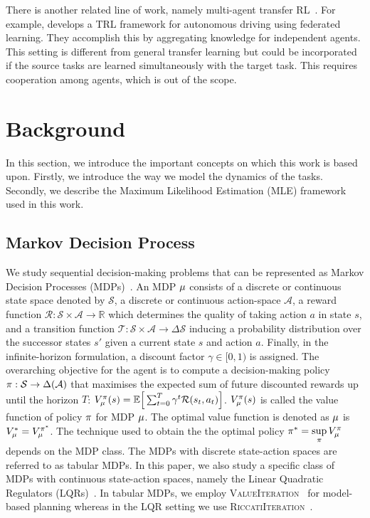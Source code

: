 There is another related line of work, namely multi-agent transfer RL~\citep{da2019survey}. For example, \citep{liang2023federated} develops a TRL framework for autonomous driving using federated learning. They accomplish this by aggregating knowledge for independent agents. This setting is different from general transfer learning but could be incorporated if the source tasks are learned simultaneously with the target task. This requires cooperation among agents, which is out of the scope.%

\section{Background}\label{sec:background}

In this section, we introduce the important concepts on which this work is based upon. Firstly, we introduce the way we model the dynamics of the tasks. Secondly, we describe the Maximum Likelihood Estimation (MLE) framework used in this work.

\subsection{Markov Decision Process}\label{sec:mdp}
We study sequential decision-making problems that can be represented as Markov Decision Processes (MDPs)~\citep{puterman2014markov}. An MDP $\mu$ consists of a discrete or continuous state space denoted by $\mathcal{S}$, a discrete or continuous action-space $\mathcal{A}$, a reward function $\mathcal{R} : \mathcal{S} \times \mathcal{A} \rightarrow \mathbb{R}$ which determines the quality of taking action $a$ in state $s$, and a transition function $\mathcal{T} : \mathcal{S} \times \mathcal{A} \rightarrow \Delta\mathcal{S}$ inducing a probability distribution over the successor states $s'$ given a current state $s$ and action $a$. Finally, in the infinite-horizon formulation, a discount factor $\gamma \in [0, 1)$ is assigned. The overarching objective for the agent is to compute a decision-making policy $\pi : \mathcal{S} \rightarrow \Delta(\mathcal{A})$ that maximises the expected sum of future discounted rewards up until the horizon $T$: $V_\mu^{\pi}(s) = \mathbb{E}\Big[\sum_{t=0}^T \gamma^t \mathcal{R}(s_t, a_t)\Big]$. $V_\mu^{\pi}(s)$ is called the value function of policy $\pi$ for MDP $\mu$. The optimal value function is denoted as $\mu$ is $V_\mu^{*} = V_\mu^{\pi^{*}}$. The technique used to obtain the the optimal policy $\pi^{*} = \underset{\pi}{\sup} \, V_\mu^{\pi}$ depends on the MDP class. The MDPs with discrete state-action spaces are referred to as tabular MDPs. In this paper, we also study a specific class of MDPs with continuous state-action spaces, namely the Linear Quadratic Regulators (LQRs)~\citep{kalman1960new}. In tabular MDPs, we employ \textsc{ValueIteration}~\citep{puterman2014markov} for model-based planning whereas in the LQR setting we use \textsc{RiccatiIteration}~\citep{willems1971least}. 

